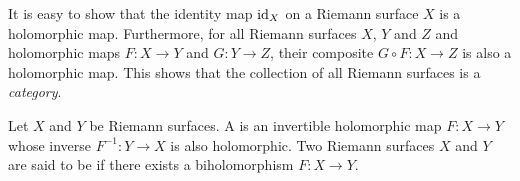 \documentclass[../Moduli_Spaces_of_Riemann_Surfaces.tex]{subfiles}
\begin{document}
    \begin{example}
        It is easy to show that the identity map $\operatorname{id}_X$ on a Riemann surface $X$ is a holomorphic map. Furthermore, for all Riemann surfaces $X$, $Y$ and $Z$ and holomorphic maps $F:X\to Y$ and $G:Y\to Z$, their composite $G\circ F:X\to Z$ is also a holomorphic map. This shows that the collection of all Riemann surfaces is a \textit{category}.\exqed
    \end{example}
    \begin{definition}\label{1.2:def:biholomorphic_Riemann_surfaces}
        Let $X$ and $Y$ be Riemann surfaces. A  is an invertible holomorphic map $F:X\to Y$ whose inverse $F^{-1}:Y\to X$ is also holomorphic. Two Riemann surfaces $X$ and $Y$ are said to be  if there exists a biholomorphism $F:X\to Y$.
    \end{definition}
\end{document}
